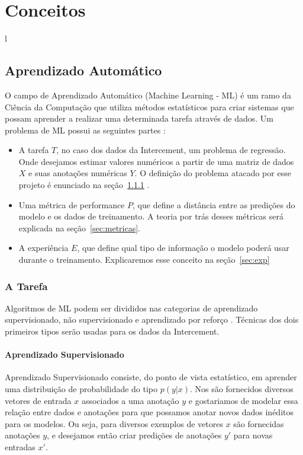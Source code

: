 \chapter{Conceitos}
l\label{cap:conceitos}


\section{Aprendizado Automático}

O campo de Aprendizado Automático (Machine Learning - ML) é um ramo da Ciência
da Computação que utiliza métodos estatísticos para criar sistemas que possam
aprender a realizar uma determinada tarefa através de dados. Um problema de ML possui
as seguintes partes \citep{dlbook}: \\

\begin{itemize}

  
\item A tarefa $T$, no caso dos dados da Intercement, um problema de regressão.
  Onde desejamos estimar valores numéricos a partir de uma matriz de dados $X$ e
  suas anotações numéricas $Y$. O definição do problema atacado por esse projeto
  é enunciado na seção~\ref{sec:tar} .
  
\item Uma métrica de performance $P$, que define a distância entre as predições
  do modelo e os dados de treinamento. A teoria por trás desses métricas será explicada na seção~\ref{sec:metricas}.

\item A experiência $E$, que define qual tipo de informação o modelo poderá usar
  durante o treinamento. Explicaremos esse conceito na seção~\ref{sec:exp} 
  
\end{itemize}

\subsection{A Tarefa}
\label{sec:tar}
Algoritmos de ML podem ser divididos nas categorias de aprendizado supervisionado, não supervisionado e aprendizado por reforço \citep{dlbook}. Técnicas dos dois primeiros tipos serão usadas para os dados da Intercement.


\subsubsection{Aprendizado Supervisionado}
\label{sec:apren} 
Aprendizado Supervisionado consiste, do ponto de vista estatístico, em aprender uma distribuição
de probabilidade do tipo $p(y | x)$. Nos são fornecidos diversos vetores de
entrada $x$ associados a uma anotação $y$ e gostariamos de modelar essa relação
entre dados e anotações para que possamos anotar novos dados inéditos para os
modelos. Ou seja, para diversos exemplos de vetores
$x$ são fornecidas anotações $y$, e desejamos então criar predições de anotações
$y'$ para novas entradas $x'$.


